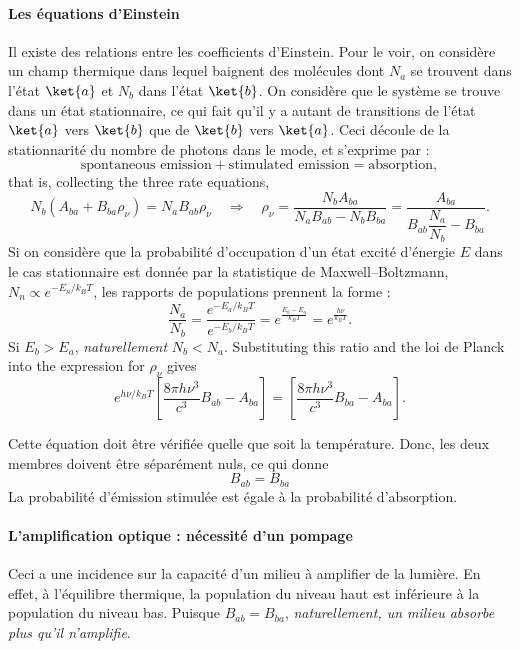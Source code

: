 \paragraph{Les équations d'Einstein}
Il existe des relations entre les coefficients d'Einstein. Pour le voir, on
considère un champ thermique dans lequel baignent des molécules dont $N_a$ se
trouvent dans l'état $\ket{a}$ et $N_b$ dans l'état $\ket{b}$. On considère que
le système se trouve dans un état stationnaire, ce qui fait qu'il y a autant de
transitions de l'état $\ket{a}$ vers $\ket{b}$ que de $\ket{b}$ vers $\ket{a}$.
Ceci découle de la stationnarité du nombre de photons dans le mode, et
s'exprime par :
\[\text{spontaneous emission}+\text{stimulated emission}=\text{absorption},\]
that is, collecting the three rate equations,
\[N_b\left(A_{ba}+B_{ba}\rho_\nu\right)=N_a B_{ab}\rho_\nu
  \quad\Longrightarrow\quad
  \rho_\nu=\frac{N_bA_{ba}}{N_aB_{ab}-N_bB_{ba}}
  =\frac{A_{ba}}{B_{ab}\dfrac{N_a}{N_b}-B_{ba}}.\]
Si on considère que la probabilité d'occupation d'un état excité d'énergie $E$
dans le cas stationnaire est donnée par la statistique de Maxwell--Boltzmann,
$N_n\propto e^{-E_n/k_BT}$, les rapports de populations prennent la forme :
\[\frac{N_a}{N_b}=\frac{e^{-E_a/k_BT}}{e^{-E_b/k_BT}}
  =e^{\frac{E_b-E_a}{k_BT}}=e^{\frac{h\nu}{k_BT}}.\]
Si $E_b>E_a$, \emph{naturellement} $N_b<N_a$. Substituting this ratio and the
loi de Planck into the expression for $\rho_\nu$ gives
\[e^{h\nu/k_BT}\left[\frac{8\pi h\nu^3}{c^3}B_{ab}-A_{ba}\right]
  =\left[\frac{8\pi h\nu^3}{c^3}B_{ba}-A_{ba}\right].\]

\begin{theorem}
  Cette équation doit être vérifiée quelle que soit la température. Donc, les
  deux membres doivent être séparément nuls, ce qui donne
  \[\boxed{\,B_{ab}=B_{ba}\,}\]
  La probabilité d'émission stimulée est égale à la probabilité d'absorption.
\end{theorem}

\paragraph{L'amplification optique : nécessité d'un pompage}
Ceci a une incidence sur la capacité d'un milieu à amplifier de la lumière. En
effet, à l'équilibre thermique, la population du niveau haut est inférieure à
la population du niveau bas. Puisque $B_{ab}=B_{ba}$, \emph{naturellement, un
milieu absorbe plus qu'il n'amplifie}.

